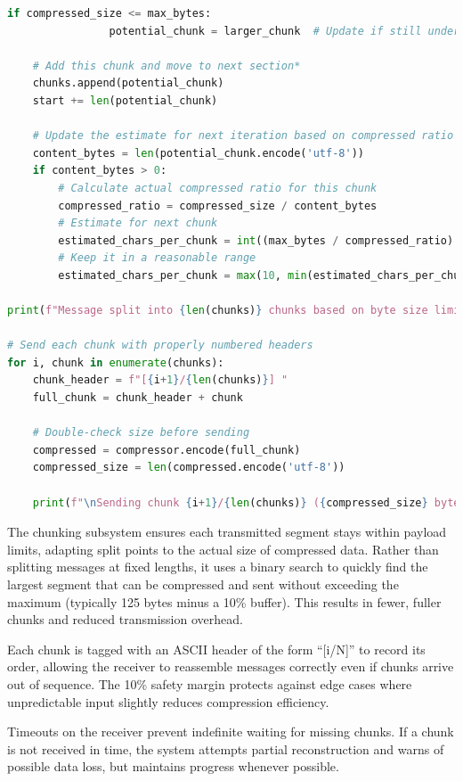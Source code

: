 \documentclass[12pt,openany]{article}
\theoremstyle{definition}
\theoremstyle{definition}
\theoremstyle{definition}
\begin{document}
\begin{lstlisting}[language=Python, caption=Chunking Algorithm]
            if compressed_size <= max_bytes:
                potential_chunk = larger_chunk  # Update if still under limit
    
    # Add this chunk and move to next section*
    chunks.append(potential_chunk)
    start += len(potential_chunk)
    
    # Update the estimate for next iteration based on compressed ratio
    content_bytes = len(potential_chunk.encode('utf-8'))
    if content_bytes > 0:
        # Calculate actual compressed ratio for this chunk
        compressed_ratio = compressed_size / content_bytes
        # Estimate for next chunk
        estimated_chars_per_chunk = int((max_bytes / compressed_ratio) * 0.9)  # 10% safety margin
        # Keep it in a reasonable range
        estimated_chars_per_chunk = max(10, min(estimated_chars_per_chunk, 100))

print(f"Message split into {len(chunks)} chunks based on byte size limit of {max_bytes} bytes")

# Send each chunk with properly numbered headers
for i, chunk in enumerate(chunks):
    chunk_header = f"[{i+1}/{len(chunks)}] "
    full_chunk = chunk_header + chunk
    
    # Double-check size before sending
    compressed = compressor.encode(full_chunk)
    compressed_size = len(compressed.encode('utf-8'))
    
    print(f"\nSending chunk {i+1}/{len(chunks)} ({compressed_size} bytes):")
\end{lstlisting}

The chunking subsystem ensures each transmitted segment stays within payload limits, adapting split points to the actual size of compressed data. Rather than splitting messages at fixed lengths, it uses a binary search to quickly find the largest segment that can be compressed and sent without exceeding the maximum (typically 125 bytes minus a 10\% buffer). This results in fewer, fuller chunks and reduced transmission overhead.

Each chunk is tagged with an ASCII header of the form “[i/N]” to record its order, allowing the receiver to reassemble messages correctly even if chunks arrive out of sequence. The 10\% safety margin protects against edge cases where unpredictable input slightly reduces compression efficiency.

Timeouts on the receiver prevent indefinite waiting for missing chunks. If a chunk is not received in time, the system attempts partial reconstruction and warns of possible data loss, but maintains progress whenever possible.
\end{document}
